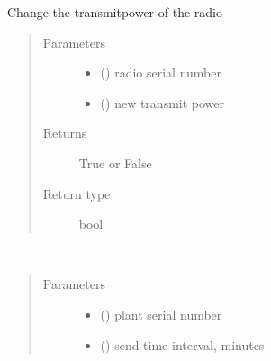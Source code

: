 \documentclass[letterpaper,10pt,english]{sphinxmanual}
\begin{document}
\begin{fulllineitems}
\label{\detokenize{index:controller.utility.update_radio_transmit_power}}
Change the transmit\sphinxhyphen{}power of the radio
\begin{quote}\begin{description}
\item[{Parameters}] \leavevmode\begin{itemize}
\item {} 
 () \textendash{} radio serial number

\item {} 
 () \textendash{} new transmit power

\end{itemize}

\item[{Returns}] \leavevmode
True or False

\item[{Return type}] \leavevmode
bool

\end{description}\end{quote}

\end{fulllineitems}


\begin{fulllineitems}
\label{\detokenize{index:controller.utility.update_send_time}}~\begin{quote}\begin{description}
\item[{Parameters}] \leavevmode\begin{itemize}
\item {} 
 () \textendash{} plant serial number

\item {} 
 () \textendash{} send time interval, minutes

\end{itemize}

\end{description}\end{quote}

\end{fulllineitems}
\end{document}
